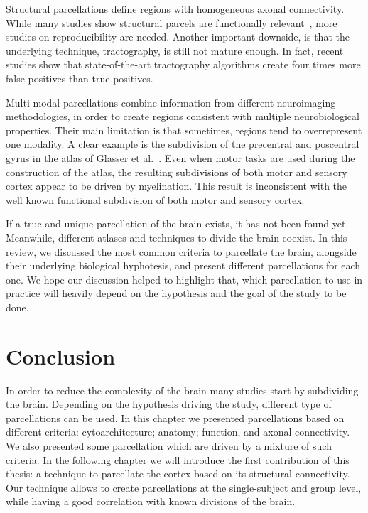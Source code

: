 Structural parcellations define regions with homogeneous axonal connectivity.
While many studies show structural parcels are functionally
relevant~\cite{Gallardo2017a, Anwander2006, ThiebautdeSchotten2016},
more studies on reproducibility are needed\cite{Zilles2013}. Another
important downside, is that the underlying technique, tractography, is still
not mature enough. In fact, recent studies show that state-of-the-art
tractography algorithms create four times more false positives than true
positives.

Multi-modal parcellations combine information from different neuroimaging methodologies,
in order to create regions consistent with multiple neurobiological properties.
Their main limitation is that sometimes, regions tend to overrepresent one
modality. A clear example is the subdivision of the precentral and poscentral
gyrus in the atlas of Glasser et al.~\cite{Glasser2016}. Even when motor tasks
are used during the construction of the atlas, the resulting subdivisions of
both motor and sensory cortex appear to be driven by myelination. This
result is inconsistent with the well known functional subdivision of both motor
and sensory cortex.

If a true and unique parcellation of the brain exists, it has not been found yet.
Meanwhile, different atlases and techniques to divide the brain coexist. In this
review, we discussed the most common criteria to parcellate the brain, alongside
their underlying biological hyphotesis, and present different parcellations 
for each one. We hope our discussion helped to highlight that, which parcellation
to use in practice will heavily depend on the hypothesis and the goal of the
study to be done.

\section{Conclusion}
In order to reduce the complexity of the brain many studies start by subdividing
the brain. Depending on the hypothesis driving the study, different type
of parcellations can be used. In this chapter we presented parcellations based
on different criteria: cytoarchitecture; anatomy; function, and axonal connectivity.
We also presented some parcellation which are driven by a mixture of such
criteria. In the following chapter we will introduce the first contribution of
this thesis: a technique to parcellate the cortex based on its structural
connectivity. Our technique allows to create parcellations at the single-subject
and group level, while having a good correlation with known divisions of the brain.

\chapterbib
